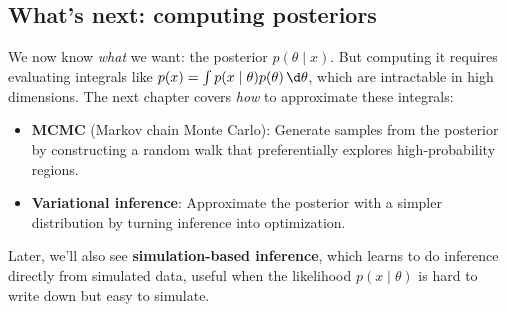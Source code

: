 \documentclass[11pt]{article}
\begin{document}
\subsection{What's next: computing posteriors}

We now know \emph{what} we want: the posterior $p(\theta \mid x)$. But computing it requires evaluating integrals like $p(x) = \int p(x \mid \theta) p(\theta)\,\d\theta$, which are intractable in high dimensions. The next chapter covers \emph{how} to approximate these integrals:
\begin{itemize}
    \item \textbf{MCMC} (Markov chain Monte Carlo): Generate samples from the posterior by constructing a random walk that preferentially explores high-probability regions.
    \item \textbf{Variational inference}: Approximate the posterior with a simpler distribution by turning inference into optimization.
\end{itemize}
Later, we'll also see \textbf{simulation-based inference}, which learns to do inference directly from simulated data, useful when the likelihood $p(x \mid \theta)$ is hard to write down but easy to simulate.
\end{document}
